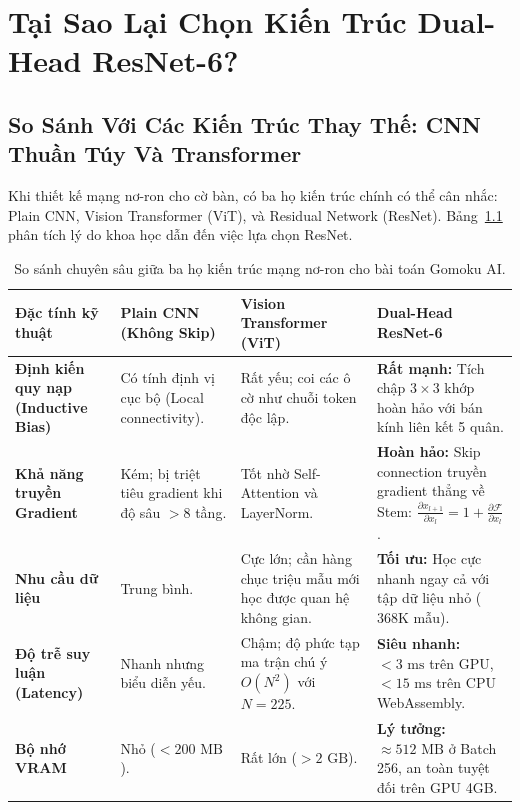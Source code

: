 \documentclass[11pt,a4paper]{report}
\begin{document}
\chapter{Tại Sao Lại Chọn Kiến Trúc Dual-Head ResNet-6?}

\section{So Sánh Với Các Kiến Trúc Thay Thế: CNN Thuần Túy Và Transformer}

Khi thiết kế mạng nơ-ron cho cờ bàn, có ba họ kiến trúc chính có thể cân nhắc: Plain CNN, Vision Transformer (ViT), và Residual Network (ResNet). Bảng~\ref{tab:architecture_comparison} phân tích lý do khoa học dẫn đến việc lựa chọn ResNet.

\begin{table}[htbp]
\centering
\caption{So sánh chuyên sâu giữa ba họ kiến trúc mạng nơ-ron cho bài toán Gomoku AI.}
\label{tab:architecture_comparison}
\small
\begin{tabularx}{\textwidth}{p{3.0cm} p{3.8cm} p{3.8cm} X}
\toprule
\textbf{Đặc tính kỹ thuật} & \textbf{Plain CNN (Không Skip)} & \textbf{Vision Transformer (ViT)} & \textbf{Dual-Head ResNet-6} \\
\midrule
\textbf{Định kiến quy nạp (Inductive Bias)} & Có tính định vị cục bộ (Local connectivity). & Rất yếu; coi các ô cờ như chuỗi token độc lập. & \textbf{Rất mạnh:} Tích chập $3\times 3$ khớp hoàn hảo với bán kính liên kết 5 quân. \\
\addlinespace
\textbf{Khả năng truyền Gradient} & Kém; bị triệt tiêu gradient khi độ sâu $> 8$ tầng. & Tốt nhờ Self-Attention và LayerNorm. & \textbf{Hoàn hảo:} Skip connection truyền gradient thẳng về Stem: $\frac{\partial x_{l+1}}{\partial x_l} = 1 + \frac{\partial \mathcal{F}}{\partial x_l}$. \\
\addlinespace
\textbf{Nhu cầu dữ liệu} & Trung bình. & Cực lớn; cần hàng chục triệu mẫu mới học được quan hệ không gian. & \textbf{Tối ưu:} Học cực nhanh ngay cả với tập dữ liệu nhỏ ($368\text{K}$ mẫu). \\
\addlinespace
\textbf{Độ trễ suy luận (Latency)} & Nhanh nhưng biểu diễn yếu. & Chậm; độ phức tạp ma trận chú ý $O(N^2)$ với $N=225$. & \textbf{Siêu nhanh:} $< 3\text{ ms}$ trên GPU, $< 15\text{ ms}$ trên CPU WebAssembly. \\
\addlinespace
\textbf{Bộ nhớ VRAM} & Nhỏ ($< 200\text{ MB}$). & Rất lớn ($> 2\text{ GB}$). & \textbf{Lý tưởng:} $\approx 512\text{ MB}$ ở Batch 256, an toàn tuyệt đối trên GPU 4GB. \\
\bottomrule
\end{tabularx}
\end{table}
\end{document}
